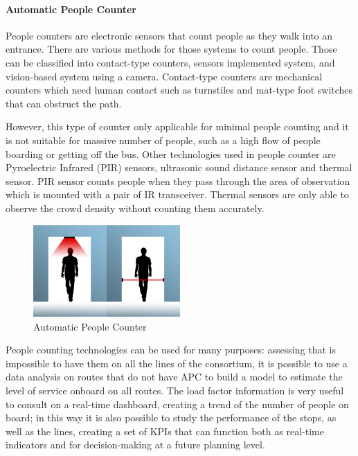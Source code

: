 \paragraph{Automatic People Counter}
People counters are electronic sensors that count people as they walk into an entrance. There are various methods for those systems to count people. Those can be classified into contact-type counters, sensors implemented system, and vision-based system using a camera. Contact-type counters are mechanical counters which need human contact such as turnstiles and mat-type foot switches that can obstruct the path. 

However, this type of counter only applicable for minimal people counting and it is not suitable for massive number of people, such as a high flow of people boarding or getting off the bus. Other technologies used in people counter are Pyroelectric Infrared (PIR) sensors, ultrasonic sound distance sensor and thermal sensor. PIR sensor counts people when they pass through the area of observation which is mounted with a pair of IR transceiver. Thermal sensors are only able to observe the crowd density without counting them accurately. 

\begin{figure}[h!]
    \centering
    \includegraphics[width=0.5\textwidth]{Images/New Technologies/APC.jpg}
    \caption{Automatic People Counter}
    \label{fig:APC}
\end{figure}

People counting technologies can be used for many purposes: assessing that is impossible to have them on all the lines of the consortium, it is possible to use a data analysis on routes that do not have APC to build a model to estimate the level of service onboard on all routes. The load factor information is very useful to consult on a real-time dashboard, creating a trend of the number of people on board; in this way it is also possible to study the performance of the stops, as well as the lines, creating a set of KPIs that can function both as real-time  indicators and for decision-making at a future planning level.

